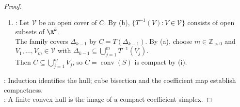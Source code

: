 \begin{proposition}
\begin{proof}
\begin{enumerate}[label=(\roman*)]
\begin{enumerate}[label=(\alph*)]
\item {}: Let $\mathcal{V}$ be an open cover of $C$. By (b), $\{T^{-1}(V):V\in\mathcal{V}\}$ consists of open subsets of $\R^k$.\\
The family covers $\Delta_{k-1}$ by $C=T(\Delta_{k-1})$. By (a), choose $m\in\mathbb{Z}_{>0}$ and $V_1,\ldots,V_m\in\mathcal{V}$ with $\Delta_{k-1}\subseteq\bigcup\limits_{j=1}^{m}T^{-1}(V_j)$.\\
Then $C\subseteq\bigcup\limits_{j=1}^{m}V_j$, so $C=\operatorname{conv}(S)$ is compact by (i).
\end{enumerate}
\end{enumerate}
: Induction identifies the hull; cube bisection and the coefficient map establish compactness.\\
: A finite convex hull is the image of a compact coefficient simplex.
\end{proof}
\end{proposition}

